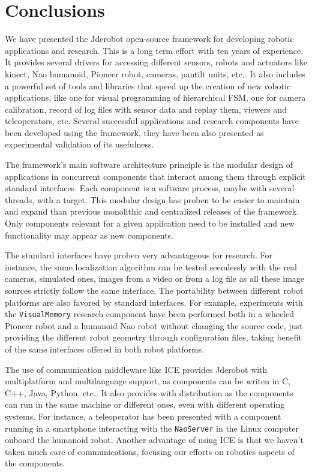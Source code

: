 \documentclass[twocolumn]{svjour3}          %
\begin{document}
\section{Conclusions}

We have presented the Jderobot open-source framework for developing robotic applications and research. This is a long term effort with ten years of experience. It provides several drivers for accessing different sensors, robots and actuators like kinect, Nao humanoid, Pioneer robot, cameras, pantilt units, etc.. It also includes a powerful set of tools and libraries that speed up the creation of new robotic applications, like one for visual programming of hierarchical FSM, one for camera calibration, record of log files with sensor data and replay them, viewers and teleoperators, etc. Several successful applications and research components have been developed using the framework, they have been also presented as experimental validation of its usefulness.

The framework's main software architecture principle is the modular design of applications in concurrent components that interact among them through explicit standard interfaces. Each component is a software process, maybe with several threads, with a target. This modular design has proben to be easier to maintain and expand than previous monolithic and centralized releases of the framework. Only components relevant for a given application need to be installed and new functionality may appear as new components.

The standard interfaces have proben very advantageous for research. For instance, the same localization algorithm can be tested seemlessly with the real cameras, simulated ones, images from a video or from a log file as all these image sources strictly follow the same interface. The portability between different robot platforms are also favored by standard interfaces. For example, experiments with the \texttt{VisualMemory} research component have been performed both in a wheeled Pioneer robot and a humanoid Nao robot without changing the source code, just providing the different robot geometry through configuration files, taking benefit of the same interfaces offered in both robot platforms.

The use of communication middleware like ICE provides Jderobot with multiplatform and multilanguage support, as components can be writen in C, C++, Java, Python, etc.. It also provides with distribution as the components can run in the same machine or different ones, even with different operating systems. For instance, a teleoperator has been presented with a component running in a smartphone interacting with the \texttt{NaoServer} in the Linux computer onboard the humanoid robot. Another advantage of using ICE is that we haven't taken much care of communications, focusing our efforts on robotics aspects of the components.
\end{document}

